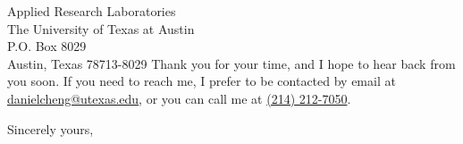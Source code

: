 \documentclass{letter} %
\begin{document}
\begin{letter}{Applied Research Laboratories \\
The University of Texas at Austin \\
P.O. Box 8029\\
Austin, Texas 78713-8029}
\noindent Thank you for your time, and I hope to hear back from you
soon. If you need to reach me, I prefer to be contacted by email at
\href{mailto:danielcheng@utexas.edu}{danielcheng@utexas.edu}, or
you can call me at \href{tel:12142127050}{(214) 212-7050}.

\closing{Sincerely yours,} 
 

 

\end{letter}
 
\end{document}
